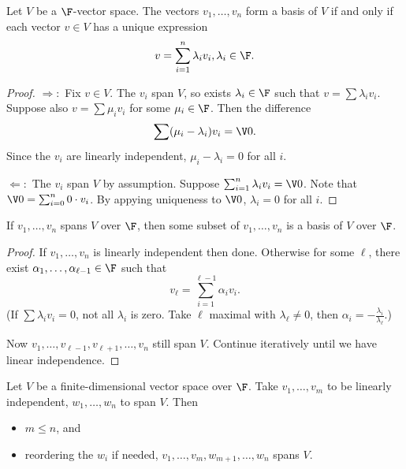 \documentclass[a4paper]{article}
\theoremstyle{definition}
\begin{document}
\begin{lem}
  Let $V$ be a $\F$-vector space. The vectors $v_1,\ldots,v_n$ form a basis of $V$ if and only if each vector $v\in V$ has a unique expression
  \[
    v = \sum_{i=1}^n \lambda_i v_i, \lambda_i \in \F.
  \]
  
\end{lem}

\begin{proof}\leavevmode
  $\Rightarrow:$ Fix $v\in V$. The $v_i$ span $V$, so exists $\lambda_i \in \F$ such that $v = \sum \lambda_i v_i$. Suppose also $v = \sum \mu_i v_i$ for some $\mu_i \in \F$. Then the difference
  \[
    \sum (\mu_i - \lambda_i) v_i = \V 0.
  \]
  Since the $v_i$ are linearly independent, $\mu_i-\lambda_i = 0$ for all $i$.

  $\Leftarrow:$ The $v_i$ span $V$ by assumption. Suppose $\sum_{i=1}^n \lambda_i v_i = \V 0$. Note that $\V 0 = \sum_{i=0}^n 0 \cdot v_i$. By appying uniqueness to $\V 0$, $\lambda_i = 0$ for all $i$. 
\end{proof}

\begin{lem}
  If $v_1,\ldots, v_n$ spans $V$ over $\F$, then some subset of $v_1,\ldots,v_n$ is a basis of $V$ over $\F$.
\end{lem}

\begin{proof}
  If $v_1,\ldots, v_n$ is linearly independent then done. Otherwise for some $\ell$, there exist $\alpha_1, \ldots, \alpha_{\ell-1} \in \F$ such that
  \[
    v_\ell = \sum_{i=1}^{\ell-1} \alpha_i v_i.
  \]
  (If $\sum \lambda_i v_i = 0$, not all $\lambda_i$ is zero. Take $\ell$ maximal with $\lambda_\ell \neq 0$, then $\alpha_i = -\frac{\lambda_i}{\lambda_\ell}$.)

  Now $v_1,\ldots,v_{\ell-1},v_{\ell+1},\ldots,v_n$ still span $V$. Continue iteratively until we have linear independence.
\end{proof}

\begin{thm}
  Let $V$ be a finite-dimensional vector space over $\F$. Take $v_1,\ldots,v_m$ to be linearly independent, $w_1,\ldots,w_n$ to span $V$. Then
  \begin{itemize}
  \item $m \leq n$, and
    \item reordering the $w_i$ if needed, $v_1,\ldots, v_m, w_{m+1},\ldots,w_n$ spans $V$.
  \end{itemize}
\end{thm}
\end{document}
